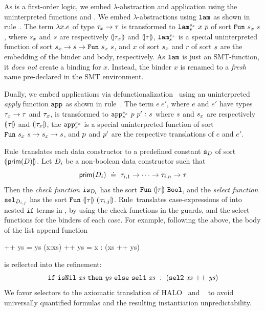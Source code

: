 %
As \smtlan is a first-order logic, we
embed $\lambda$-abstraction and application
using the uninterpreted functions
\smtlamname{}{} and \smtappname{}{}.
%
We embed $\lambda$-abstractions
using $\texttt{lam}^{}_{}$ as shown in rule~\lgfun.
%
The term $\lambda x. e$ of type
${\tau_x \rightarrow \tau}$ is transformed
to
${\smtlamname{\sort_x}{\sort}\ x\ \pred}$
of sort
${\mathtt{Fun}\ {s_x}\ {s}}$, where
%
$s_x$ and $s$ are respectively
$(\!|\tau_x|\!)$ and $(\!|\tau|\!)$,
%
${\texttt{lam}^{s_x}_{s}}$
is a special uninterpreted function
of sort
${s_x \rightarrow s\rightarrow\mathtt{Fun}\ {s_x}\ {s}}$,
and
$x$ of sort $s_x$ and $r$ of sort $s$ are
the embedding of the binder and body, respectively.
%
As $\texttt{lam}^{}_{}$ is just an SMT-function,
it \emph{does not} create a binding for $x$.
%
Instead, the binder $x$ is renamed to
a \emph{fresh} name pre-declared in
the SMT environment.


%
Dually, we embed applications via
defunctionalization~\citep{Reynolds72}
using an uninterpreted \emph{apply}
function
$\texttt{app}^{}_{}$ as shown in rule~\lgapp.
%
The term ${e\ e'}$, where $e$ and $e'$ have
types ${\tau_x \rightarrow \tau}$ and $\tau_x$,
is transformed to
${\tbind{\smtappname{\sort_x}{\sort}\ \pred\ \pred'}{\sort}}$
where
%
$s$ and $s_x$ are respectively $(\!|\tau|\!)$ and $(\!|\tau_x|\!)$,
the
${\texttt{app}^{s_x}_{s}}$
is a special uninterpreted function of sort
${\mathtt{Fun}\ {s_x}\ {s} \rightarrow s_x \rightarrow s}$,
and
$p$ and $p'$ are the respective translations of $e$ and $e'$.


%
Rule~\lgdc translates each data constructor to a
predefined \smtlan constant ${\texttt{s}_{D}}$ of
sort ${(\!|\mathsf{prim}(D)|\!)}$.
%
Let $D_i$ be a non-boolean data constructor such that
$$
\mathsf{prim}(D_i) \ \doteq\  \tau_{i,1} \rightarrow \dots \rightarrow \tau_{i,n} \rightarrow \tau
$$
Then the \emph{check function}
${\texttt{is}_{{D_i}}}$ has the sort
$\mathtt{Fun}\ {(\!|\tau|\!)}\ {\texttt{Bool}}$,
and the \emph{select function}
${\texttt{sel}_{{D}_{i,j}}}$ has the sort
$\mathtt{Fun}\ {(\!|\tau|\!)}\ {(\!|\tau_{i,j}|\!)}$.
%
Rule~\lgcase translates case-expressions
of \corelan into nested $\mathtt{if}$
terms in \smtlan, by using the check
functions in the guards, and the
select functions for the binders
of each case.
%
%
%
For example, following the above, the body of the list append function
%
\begin{code}
  []     ++ ys = ys
  (x:xs) ++ ys = x : (xs ++ ys)
\end{code}
%
is reflected into the \smtlan refinement:
%
$$
\ite{\mathtt{isNil}\ \mathit{xs}}
    {\mathit{ys}}
    {\mathtt{sel1}\ \mathit{xs}\
       \dcons\
       (\mathtt{sel2}\ \mathit{xs} \ \mathtt{++}\  \mathit{ys})}
$$
%
We favor selectors to the axiomatic translation of
HALO~\citep{HALO} and \fstar~\cite{fstar} to avoid
universally quantified formulas and the resulting
instantiation unpredictability.

